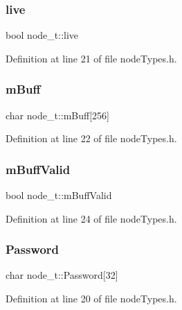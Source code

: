 \subsubsection{\texorpdfstring{live}{live}}
{\footnotesize\ttfamily bool node\+\_\+t\+::live}



Definition at line 21 of file node\+Types.\+h.

\mbox{\label{structnode__t_a40ce9b00734fbf0b05ef9da40cba7d8e}} 
\subsubsection{\texorpdfstring{m\+Buff}{mBuff}}
{\footnotesize\ttfamily char node\+\_\+t\+::m\+Buff\mbox{[}256\mbox{]}}



Definition at line 22 of file node\+Types.\+h.

\mbox{\label{structnode__t_a74ee1033ab93be44465c51e70bb4f6bd}} 
\subsubsection{\texorpdfstring{m\+Buff\+Valid}{mBuffValid}}
{\footnotesize\ttfamily bool node\+\_\+t\+::m\+Buff\+Valid}



Definition at line 24 of file node\+Types.\+h.

\mbox{\label{structnode__t_a02df80f8b236ada854aa6040a7267cde}} 
\subsubsection{\texorpdfstring{Password}{Password}}
{\footnotesize\ttfamily char node\+\_\+t\+::\+Password\mbox{[}32\mbox{]}}



Definition at line 20 of file node\+Types.\+h.

\mbox{\label{structnode__t_a73b1098ca6535de652cd2d0c1e1be944}} 
